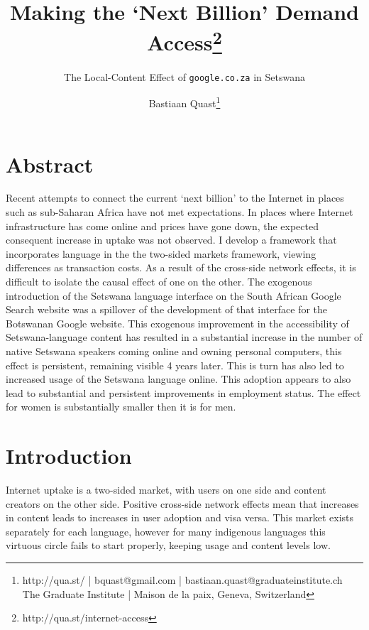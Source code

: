 \documentclass[a4paper,british]{article}\usepackage[]{graphicx}\usepackage[]{xcolor}
\providecommand*{\code}[1]{\texttt{#1}}
\begin{document}
\title{Making the `Next Billion' Demand Access\thanks{http://qua.st/internet-access}}
\author{The Local-Content Effect of \code{google.co.za} in Setswana}
\date{Bastiaan Quast\thanks{http://qua.st/ | bquast@gmail.com | bastiaan.quast@graduateinstitute.ch\protect \\
The Graduate Institute | Maison de la paix, Geneva, Switzerland}}

\maketitle




\section*{Abstract}

Recent attempts to connect the current `next billion' to the Internet
in places such as sub-Saharan Africa have not met expectations. In
places where Internet infrastructure has come online and prices have
gone down, the expected consequent increase in uptake was not observed.
I develop a framework that incorporates language in the the two-sided
markets framework, viewing differences as transaction costs. As a
result of the cross-side network effects, it is difficult to isolate
the causal effect of one on the other. The exogenous introduction
of the Setswana language interface on the South African Google Search
website was a spillover of the development of that interface for the
Botswanan Google website. This exogenous improvement in the accessibility
of Setswana-language content has resulted in a substantial increase
in the number of native Setswana speakers coming online and owning
personal computers, this effect is persistent, remaining visible 4
years later. This is turn has also led to increased usage of the Setswana
language online. This adoption appears to also lead to substantial
and persistent improvements in employment status. The effect for women
is substantially smaller then it is for men. 

\section{Introduction}

\label{sec:intro-1}Internet uptake is a two-sided market, with users
on one side and content creators on the other side. Positive cross-side
network effects mean that increases in content leads to increases
in user adoption and visa versa. This market exists separately for
each language, however for many indigenous languages this virtuous
circle fails to start properly, keeping usage and content levels low. 
\end{document}
